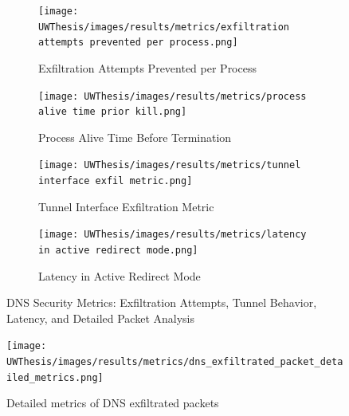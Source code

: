 \documentclass [11pt, proquest] {uwthesis}[2020/02/24]
\begin{document}
\begin{figure}[H]
  \centering
  \begin{subfigure}[b]{0.48\textwidth}
    \texttt{[image: UWThesis/images/results/metrics/exfiltration attempts prevented per process.png]}
    \caption{Exfiltration Attempts Prevented per Process}
  \end{subfigure}
  \hfill
  \begin{subfigure}[b]{0.48\textwidth}
    \texttt{[image: UWThesis/images/results/metrics/process alive time prior kill.png]}
    \caption{Process Alive Time Before Termination}
  \end{subfigure}
  \vspace{0.5cm}

  \begin{subfigure}[b]{0.48\textwidth}
    \texttt{[image: UWThesis/images/results/metrics/tunnel interface exfil metric.png]}
    \caption{Tunnel Interface Exfiltration Metric}
  \end{subfigure}
  \hfill
  \begin{subfigure}[b]{0.48\textwidth}
    \texttt{[image: UWThesis/images/results/metrics/latency in active redirect mode.png]}
    \caption{Latency in Active Redirect Mode}
  \end{subfigure}
  \caption{DNS Security Metrics: Exfiltration Attempts, Tunnel Behavior, Latency, and Detailed Packet Analysis}
  
  \vspace{0.8cm}
\end{figure}

\begin{figure}[H]
    \centering
    \texttt{[image: UWThesis/images/results/metrics/dns\_exfiltrated\_packet\_detailed\_metrics.png]}
    \caption{Detailed metrics of DNS exfiltrated packets}
    \label{fig:dns-exfil-packet-metrics}
\end{figure}
\end{document}
